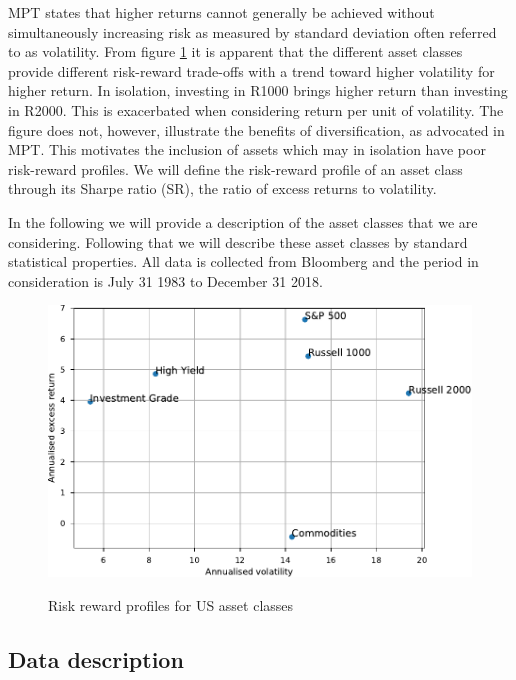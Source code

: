 \documentclass[11pt,a4paper,oneside]{article}
\begin{document}
MPT states that higher returns cannot generally be achieved without simultaneously increasing risk as measured by standard deviation often referred to as volatility. From figure \ref{riskreward} it is apparent that the different asset classes provide different risk-reward trade-offs with a trend toward higher volatility for higher return. In isolation, investing in R1000 brings higher return than investing in R2000. This is exacerbated when considering return per unit of volatility. The figure does not, however, illustrate the benefits of diversification, as advocated in MPT. This motivates the inclusion of assets which may in isolation have poor risk-reward profiles. We will define the risk-reward profile of an asset class through its Sharpe ratio (SR), the ratio of excess returns to volatility. 

In the following we will provide a description of the asset classes that we are considering. Following that we will describe these asset classes by standard statistical properties. All data is collected from Bloomberg and the period in consideration is July 31 1983 to December 31 2018.    


\begin{figure}[ht]
\centering
\vspace{4mm}
\caption{Risk reward profiles for US asset classes}
\label{riskreward}
\includegraphics[scale=1]{images/Sharpes.pdf}
\begingroup
\vspace{4mm}
\endgroup
\end{figure}

\subsection{Data description}\label{datadescription}
\end{document}
